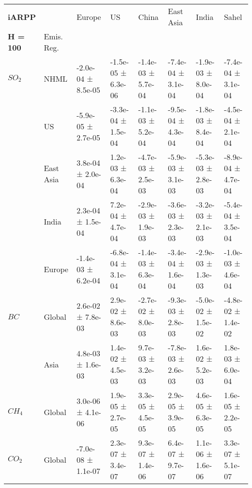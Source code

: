 \documentclass[preview]{standalone}
\newcommand{\nm}{\phantom{-}}
\begin{document}
	\tiny
	\begin{minipage}{\textwidth}
		\setlength\tabcolsep{5pt}
		\begin{tabular}{llllllll}
			\toprule
			\textbf{iARPP}       &        &               Europe &                   US &                China &            East Asia &                India &                Sahel \\
			\textbf{H = 100} & Emis. Reg. &                      &                      &                      &                      &                      &                      \\
			\midrule
$SO_2$ & NHML &  -2.0e-04 ±  8.5e-05 &  -1.5e-05 ±  6.3e-06 &  -1.4e-03 ±  5.7e-04 &  -7.4e-04 ±  3.1e-04 &  -1.9e-03 ±  8.0e-04 &  -7.4e-04 ±  3.1e-04 \\
       & US &  -5.9e-05 ±  2.7e-05 &  -3.3e-04 ±  1.5e-04 &  -1.1e-03 ±  5.2e-04 &  -9.5e-04 ±  4.3e-04 &  -1.8e-03 ±  8.4e-04 &  -4.5e-04 ±  2.1e-04 \\
       & East Asia &   3.8e-04 ±  2.0e-04 &   \nm1.2e-03 ±  6.3e-04 &  -4.7e-03 ±  2.5e-03 &  -5.9e-03 ±  3.1e-03 &  -5.3e-03 ±  2.8e-03 &  -8.9e-04 ±  4.7e-04 \\
       & India &   \nm2.3e-04 ±  1.5e-04 &   \nm7.2e-04 ±  4.7e-04 &  -2.9e-03 ±  1.9e-03 &  -3.6e-03 ±  2.3e-03 &  -3.2e-03 ±  2.1e-03 &  -5.4e-04 ±  3.5e-04 \\
       & Europe &  -1.4e-03 ±  6.2e-04 &  -6.8e-04 ±  3.1e-04 &  -1.4e-03 ±  6.3e-04 &  -3.4e-04 ±  1.6e-04 &  -2.9e-03 ±  1.3e-03 &  -1.0e-03 ±  4.6e-04 \\
\cmidrule(lr){1-8}
$BC$ & Global &   \nm2.6e-02 ±  7.8e-03 &   \nm2.9e-02 ±  8.6e-03 &  -2.7e-02 ±  8.0e-03 &  -9.3e-03 ±  2.8e-03 &  -5.0e-02 ±  1.5e-02 &  -4.8e-02 ±  1.4e-02 \\
       & Asia &   \nm4.8e-03 ±  1.6e-03 &   \nm1.4e-02 ±  4.5e-03 &   \nm9.7e-03 ±  3.2e-03 &  -7.8e-03 ±  2.6e-03 &   \nm1.6e-02 ±  5.2e-03 &   \nm1.8e-03 ±  6.0e-04 \\
\cmidrule(lr){1-8}
$CH_4$ & Global &   \nm3.0e-06 ±  4.1e-06 &   \nm1.9e-05 ±  2.7e-05 &   \nm3.3e-05 ±  4.5e-05 &   \nm2.9e-05 ±  3.9e-05 &   \nm4.6e-05 ±  6.3e-05 &   \nm1.6e-05 ±  2.2e-05 \\
\cmidrule(lr){1-8}
$CO_2$ & Global &  -7.0e-08 ±  1.1e-07 &   \nm2.3e-07 ±  3.4e-07 &   \nm9.3e-07 ±  1.4e-06 &   \nm6.4e-07 ±  9.7e-07 &   \nm1.1e-06 ±  1.6e-06 &   \nm3.3e-07 ±  5.1e-07 \\
\bottomrule
\end{tabular}

        \end{minipage}
        
\end{document}
